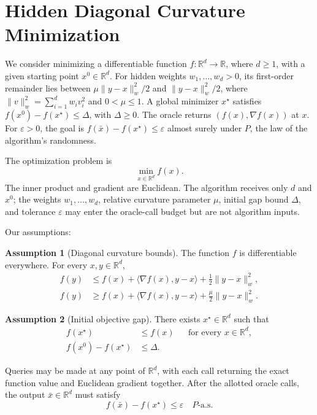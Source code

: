 \documentclass[10pt]{article}
\theoremstyle{definition}
\newtheorem{assumption}{Assumption}
\begin{document}
\section*{Hidden Diagonal Curvature Minimization}
We consider minimizing a differentiable function $f:\mathbb{R}^d\to\mathbb{R}$, where $d\geq1$, with a given starting point $x^0\in\mathbb{R}^d$. For hidden weights $w_1,\ldots,w_d>0$, its first-order remainder lies between $\mu\|y-x\|_w^2/2$ and $\|y-x\|_w^2/2$, where $\|v\|_w^2=\sum_{i=1}^d w_i v_i^2$ and $0<\mu\leq1$. A global minimizer $x^\star$ satisfies $f(x^0)-f(x^\star)\leq\Delta$, with $\Delta\geq0$. The oracle returns $(f(x),\nabla f(x))$ at $x$. For $\varepsilon>0$, the goal is $f(\bar{x})-f(x^\star)\leq\varepsilon$ almost surely under $P$, the law of the algorithm's randomness.

The optimization problem is
\[
\min_{x\in\mathbb{R}^d} f(x).
\]
The inner product and gradient are Euclidean. The algorithm receives only $d$ and $x^0$; the weights $w_1,\ldots,w_d$, relative curvature parameter $\mu$, initial gap bound $\Delta$, and tolerance $\varepsilon$ may enter the oracle-call budget but are not algorithm inputs.

Our assumptions:
\begin{assumption}[Diagonal curvature bounds]
The function $f$ is differentiable everywhere. For every $x,y\in\mathbb{R}^d$,
\[
\begin{aligned}
f(y)&\leq f(x)+\langle\nabla f(x),y-x\rangle
       +\frac{1}{2}\|y-x\|_w^2,\\
f(y)&\geq f(x)+\langle\nabla f(x),y-x\rangle
       +\frac{\mu}{2}\|y-x\|_w^2.
\end{aligned}
\]
\end{assumption}

\begin{assumption}[Initial objective gap]
There exists $x^\star\in\mathbb{R}^d$ such that
\[
\begin{aligned}
f(x^\star)&\leq f(x) &&\text{for every }x\in\mathbb{R}^d,\\
f(x^0)-f(x^\star)&\leq\Delta.
\end{aligned}
\]
\end{assumption}

Queries may be made at any point of $\mathbb{R}^d$, with each call returning the exact function value and Euclidean gradient together. After the allotted oracle calls, the output $\bar{x}\in\mathbb{R}^d$ must satisfy
\[
f(\bar{x})-f(x^\star)\leq\varepsilon
\quad P\text{-a.s.}
\]
\end{document}
